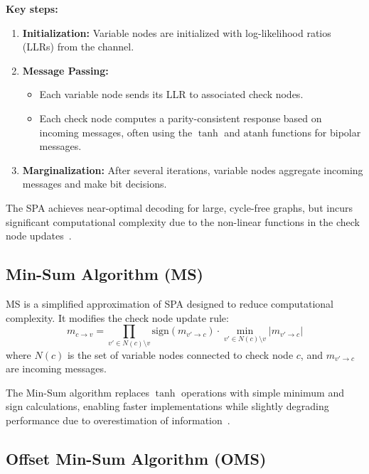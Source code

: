 \documentclass[../main.tex]{subfiles}
\begin{document}
\textbf{Key steps:}
\begin{enumerate}
    \item \textbf{Initialization:} Variable nodes are initialized with log-likelihood ratios (LLRs) from the channel.
    \item \textbf{Message Passing:}
        \begin{itemize}
            \item Each variable node sends its LLR to associated check nodes.
            \item Each check node computes a parity-consistent response based on incoming messages, often using the $\tanh$ and $\mathrm{atanh}$ functions for bipolar messages.
        \end{itemize}
    \item \textbf{Marginalization:} After several iterations, variable nodes aggregate incoming messages and make bit decisions.
\end{enumerate}
The SPA achieves near-optimal decoding for large, cycle-free graphs, but incurs significant computational complexity due to the non-linear functions in the check node updates~\cite{Karthikeyan2020, Condo2019}.

\subsection{Min-Sum Algorithm (MS)}

MS is a simplified approximation of SPA designed to reduce computational complexity. It modifies the check node update rule:
\begin{equation}
    m_{c \to v} = \prod_{v' \in N(c) \setminus v} \mathrm{sign}(m_{v' \to c}) \cdot \min_{v' \in N(c) \setminus v} |m_{v' \to c}|
\end{equation}
where $N(c)$ is the set of variable nodes connected to check node $c$, and $m_{v' \to c}$ are incoming messages.

The Min-Sum algorithm replaces $\tanh$ operations with simple minimum and sign calculations, enabling faster implementations while slightly degrading performance due to overestimation of information~\cite{Schmalen2021, NumberAnalytics2025}.


\subsection{Offset Min-Sum Algorithm (OMS)}
\end{document}
